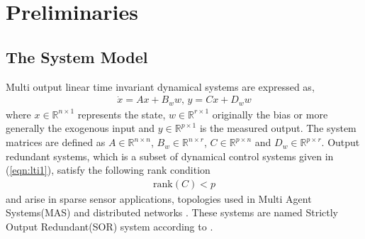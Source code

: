 \documentclass[pdflatex,sn-mathphys-num]{sn-jnl}%
\theoremstyle{thmstyleone}%
\theoremstyle{thmstyletwo}%
\theoremstyle{thmstylethree}%
\begin{document}
\section{Preliminaries}
\subsection{The System Model}
Multi output linear time invariant dynamical systems are expressed as,
\begin{gather} 
    \dot{x}=A x+B_w w,\,y=C x+D_w w\label{eqn:lti1}
\end{gather}
where $x\in\mathbb{R}^{n\times 1}$ represents the state, $w\in\mathbb{R}^{r\times 1}$ originally the bias or more generally the exogenous input and $y\in\mathbb{R}^{p\times 1}$ is the measured output. The system matrices are defined as $A\in\mathbb{R}^{n\times n}$, $B_w\in\mathbb{R}^{n\times r}$, $C\in\mathbb{R}^{p\times n}$ and $D_w\in\mathbb{R}^{p\times r}$. Output redundant systems, which is a subset of dynamical control systems given in (\ref{eqn:lti1}), satisfy the following rank condition
\begin{gather}
    \mathrm{rank}(C)<p\label{eqn:rank_cond_sor}
\end{gather}
and arise in sparse sensor applications\cite{shoukry2015event}, topologies used in Multi Agent Systems(MAS)\cite{olfati2007consensus} and distributed networks \cite{yang2022sensor}. These systems are named Strictly Output Redundant(SOR) system according to \cite{yang2025output}. 
\end{document}
